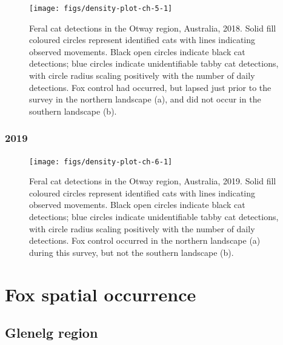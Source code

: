\documentclass[]{elsarticle} %
\begin{document}
\begin{figure}

{\centering \texttt{[image: figs/density-plot-ch-5-1]} 

}

\caption{Feral cat detections in the Otway region, Australia, 2018. Solid fill coloured circles represent identified cats with lines indicating observed movements. Black open circles indicate black cat detections; blue circles indicate unidentifiable tabby cat detections, with circle radius scaling positively with the number of daily detections. Fox control had occurred, but lapsed just prior to the survey in the northern landscape (a), and did not occur in the southern landscape (b).}\label{fig:density-plot-ch-5}
\end{figure}

\newpage

\hypertarget{section-2}{%
\subsubsection{2019}\label{section-2}}

\begin{figure}

{\centering \texttt{[image: figs/density-plot-ch-6-1]} 

}

\caption{Feral cat detections in the Otway region, Australia, 2019. Solid fill coloured circles represent identified cats with lines indicating observed movements. Black open circles indicate black cat detections; blue circles indicate unidentifiable tabby cat detections, with circle radius scaling positively with the number of daily detections. Fox control occurred in the northern landscape (a) during this survey, but not the southern landscape (b).}\label{fig:density-plot-ch-6}
\end{figure}

\newpage

\hypertarget{density-app-fox}{%
\section{Fox spatial occurrence}\label{density-app-fox}}

\hypertarget{glenelg-region-1}{%
\subsection{Glenelg region}\label{glenelg-region-1}}
\end{document}
